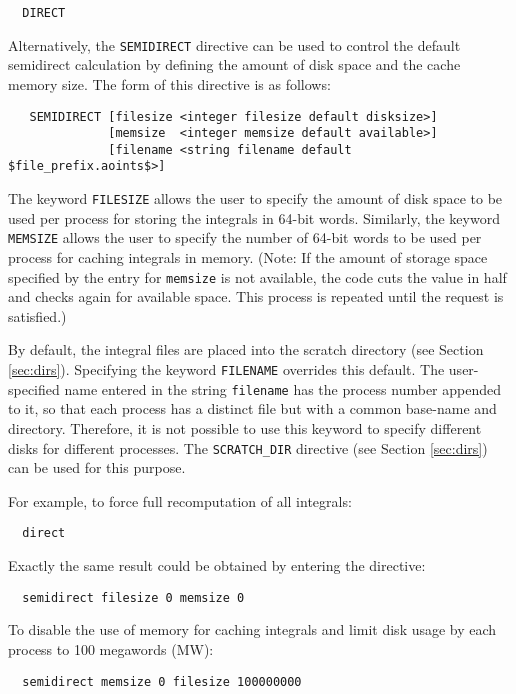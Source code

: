 \begin{verbatim}
  DIRECT
\end{verbatim}

Alternatively, the \verb+SEMIDIRECT+ directive can be used to control
the default semidirect calculation by defining the amount of disk
space and the cache memory size.  The form of this directive is as
follows:

\begin{verbatim}
   SEMIDIRECT [filesize <integer filesize default disksize>] 
              [memsize  <integer memsize default available>]
              [filename <string filename default $file_prefix.aoints$>]
\end{verbatim}

The keyword \verb+FILESIZE+ allows the user to specify the amount of
disk space to be used per process for storing the integrals in 64-bit
words.  Similarly, the keyword \verb+MEMSIZE+ allows the user to
specify the number of 64-bit words to be used per process for caching
integrals in memory. (Note: If the amount of storage space specified
by the entry for \verb+memsize+ is not available, the code cuts the
value in half and checks again for available space.  This process is
repeated until the request is satisfied.)

By default, the integral files are placed into the scratch directory
(see Section \ref{sec:dirs}). Specifying the keyword \verb+FILENAME+
overrides this default.  The user-specified name entered in the string
\verb+filename+ has the process number appended to it, so that each
process has a distinct file but with a common base-name and directory.
Therefore, it is not possible to use this keyword to specify different
disks for different processes.  The \verb+SCRATCH_DIR+ directive (see
Section \ref{sec:dirs}) can be used for this purpose.

For example, to force full recomputation of all integrals:
\begin{verbatim}
  direct
\end{verbatim}

Exactly the same result could be obtained by entering the directive:
\begin{verbatim}
  semidirect filesize 0 memsize 0
\end{verbatim}

To disable the use of memory for caching integrals and limit disk
usage by each process to 100 megawords (MW):
\begin{verbatim}
  semidirect memsize 0 filesize 100000000
\end{verbatim}

